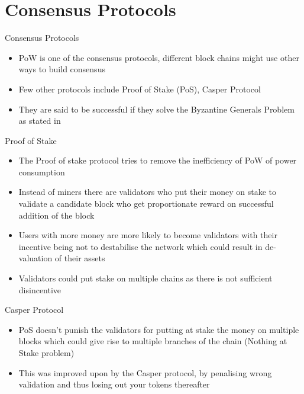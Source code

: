 \documentclass{beamer}
\begin{document}
\section{Consensus Protocols}
\begin{frame}{Consensus Protocols}
    \begin{itemize}
        \item PoW is one of the consensus protocols, different block chains might use other ways to build consensus
        \item Few other protocols include Proof of Stake (PoS), Casper Protocol
        \item They are said to be successful if they solve the  Byzantine Generals Problem as stated in \cite{lamport1982byzantine}
    \end{itemize}
\end{frame}
\begin{frame}{Proof of Stake}
\begin{itemize}
    \item The Proof of stake protocol tries to remove the inefficiency of PoW of power consumption
    \item Instead of miners there are validators who put their money on stake to validate a candidate block who get proportionate reward on successful addition of the block
    \item Users with more money are more likely to become validators with their incentive being not to destabilise the network which could result in de-valuation of their assets
    \item Validators could put stake on multiple chains as there is not sufficient disincentive 
\end{itemize}

    
\end{frame}
\begin{frame}{Casper Protocol}
\begin{itemize}
    \item PoS doesn't punish the validators for putting at stake the money on multiple blocks which could give rise to multiple branches of the chain (Nothing at Stake problem)
    \item This was improved upon by the Casper protocol, by penalising wrong validation and thus losing out your tokens thereafter
\end{itemize}
    
\end{frame}
\end{document}
